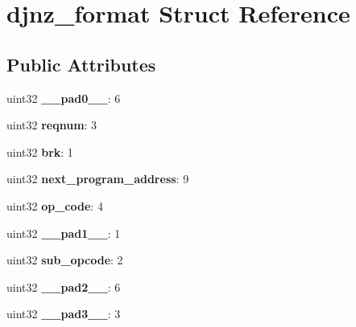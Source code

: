 \hypertarget{structdjnz__format}{}\section{djnz\+\_\+format Struct Reference}
\label{structdjnz__format}
\subsection*{Public Attributes}
\begin{DoxyCompactItemize}
\item 
\mbox{\label{structdjnz__format_a9a3d020116cbada37b07beb48e48fd4e}} 
uint32 {\bfseries \+\_\+\+\_\+pad0\+\_\+\+\_\+}\+: 6
\item 
\mbox{\label{structdjnz__format_a18936fd3ff63b2353d30fd1a7a0729f5}} 
uint32 {\bfseries reqnum}\+: 3
\item 
\mbox{\label{structdjnz__format_a82dbd6ca4efd0906260605d9835346a5}} 
uint32 {\bfseries brk}\+: 1
\item 
\mbox{\label{structdjnz__format_a45b8029687741ddf001a75fa87c746c9}} 
uint32 {\bfseries next\+\_\+program\+\_\+address}\+: 9
\item 
\mbox{\label{structdjnz__format_a5f91edb441cc236d5b0e7417c775834e}} 
uint32 {\bfseries op\+\_\+code}\+: 4
\item 
\mbox{\label{structdjnz__format_aae0114a2217454f10ae3c85584d7ac42}} 
uint32 {\bfseries \+\_\+\+\_\+pad1\+\_\+\+\_\+}\+: 1
\item 
\mbox{\label{structdjnz__format_af99f6208ef33599f02e56c9f90c09ec8}} 
uint32 {\bfseries sub\+\_\+opcode}\+: 2
\item 
\mbox{\label{structdjnz__format_a0a7db774d4ac6f233744e504d41ff584}} 
uint32 {\bfseries \+\_\+\+\_\+pad2\+\_\+\+\_\+}\+: 6
\item 
\mbox{\label{structdjnz__format_a4267a34fa364e098074376522ffbcdd9}} 
uint32 {\bfseries \+\_\+\+\_\+pad3\+\_\+\+\_\+}\+: 3

\end{DoxyCompactItemize}
